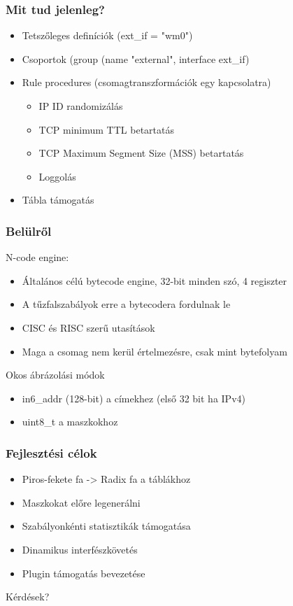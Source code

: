 \documentclass[magyar]{beamer}
\begin{document}
\begin{frame}
\frametitle{Mit tud jelenleg?}
\begin{itemize}
	\item Tetszőleges definíciók (ext\_if = "wm0")
	\item Csoportok (group (name "external", interface \textdollar ext\_if)
	\item Rule procedures (csomagtranszformációk egy kapcsolatra)
	\begin{itemize}
		\item IP ID randomizálás
		\item TCP minimum TTL betartatás
		\item TCP Maximum Segment Size (MSS) betartatás
		\item Loggolás
	\end{itemize}
	\item Tábla támogatás
\end{itemize}
\end{frame}

\begin{frame}
\frametitle{Belülről}
N-code engine:
\begin{itemize}
	\item Általános célú bytecode engine, 32-bit minden szó, 4 regiszter
	\item A tűzfalszabályok erre a bytecodera fordulnak le
	\item CISC és RISC szerű utasítások
	\item Maga a csomag nem kerül értelmezésre, csak mint bytefolyam
\end{itemize}
Okos ábrázolási módok
\begin{itemize}
	\item in6\_addr (128-bit) a címekhez (első 32 bit ha IPv4)
	\item uint8\_t a maszkokhoz
\end{itemize}
\end{frame}

\begin{frame}
\frametitle{Fejlesztési célok}
\begin{itemize}
	\item Piros-fekete fa -> Radix fa a táblákhoz
	\item Maszkokat előre legenerálni
	\item Szabályonkénti statisztikák támogatása
	\item Dinamikus interfészkövetés
	\item Plugin támogatás bevezetése
\end{itemize}
\end{frame}

\begin{frame}
\begin{center}
Kérdések?
\end{center}
\end{frame}
\end{document}
